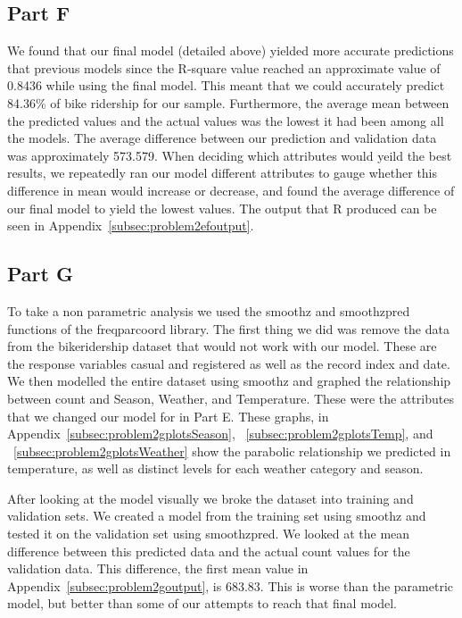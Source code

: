 \documentclass[11pt]{article}
\begin{document}
\subsection{Part F}
\label{subsec:2f}
 We found that our final model (detailed above) yielded more accurate predictions that previous models since the R-square value reached an approximate value of 0.8436 while using the final model. This meant that we could accurately predict 84.36\% of bike ridership for our sample. Furthermore, the average mean between the predicted values and the actual values was the lowest it had been among all the models. The average difference between our prediction and validation data was approximately 573.579. When deciding which attributes would yeild the best results, we repeatedly ran our model different attributes to gauge whether this difference in mean would increase or decrease, and found the average difference of our final model to yield the lowest values. The output that R produced can be seen in Appendix~\ref{subsec:problem2efoutput}.

\subsection{Part G}
\label{subsec:2g}
To take a non parametric analysis we used the smoothz and smoothzpred functions of the freqparcoord library. The first thing we did was remove the data from the bikeridership dataset that would not work with our model. These are the response variables casual and registered as well as the record index and date. We then modelled the entire dataset using smoothz and graphed the relationship between count and Season, Weather, and Temperature. These were the attributes that we changed our model for in Part E. These graphs, in Appendix~\ref{subsec:problem2gplotsSeason}, ~\ref{subsec:problem2gplotsTemp}, and ~\ref{subsec:problem2gplotsWeather} show the parabolic relationship we predicted in temperature, as well as distinct levels for each weather category and season.

After looking at the model visually we broke the dataset into training and validation sets. We created a model from the training set using smoothz and tested it on the validation set using smoothzpred. We looked at the mean difference between this predicted data and the actual count values for the validation data. This difference, the first mean value in Appendix~\ref{subsec:problem2goutput}, is 683.83. This is worse than the parametric model, but better than some of our attempts to reach that final model.
\end{document}
